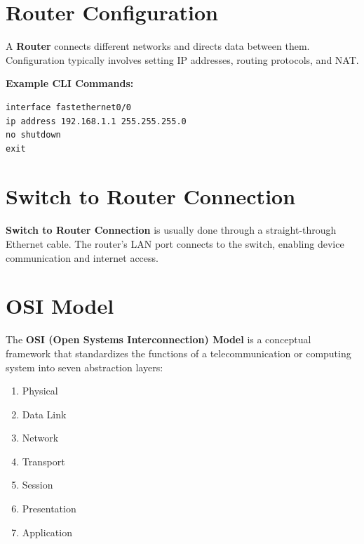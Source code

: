 \documentclass[12pt]{article}
\begin{document}
\begin{center}
\end{center}

\section{Router Configuration}
A \textbf{Router} connects different networks and directs data between them. Configuration typically involves setting IP addresses, routing protocols, and NAT.

\textbf{Example CLI Commands:}
\begin{verbatim}
interface fastethernet0/0
ip address 192.168.1.1 255.255.255.0
no shutdown
exit
\end{verbatim}

\begin{center}
\end{center}

\section{Switch to Router Connection}
\textbf{Switch to Router Connection} is usually done through a straight-through Ethernet cable. The router's LAN port connects to the switch, enabling device communication and internet access.

\begin{center}
\end{center}

\section{OSI Model}
The \textbf{OSI (Open Systems Interconnection) Model} is a conceptual framework that standardizes the functions of a telecommunication or computing system into seven abstraction layers:
\begin{enumerate}
\item Physical
\item Data Link
\item Network
\item Transport
\item Session
\item Presentation
\item Application
\end{enumerate}

\begin{center}
\end{center}
\end{document}
